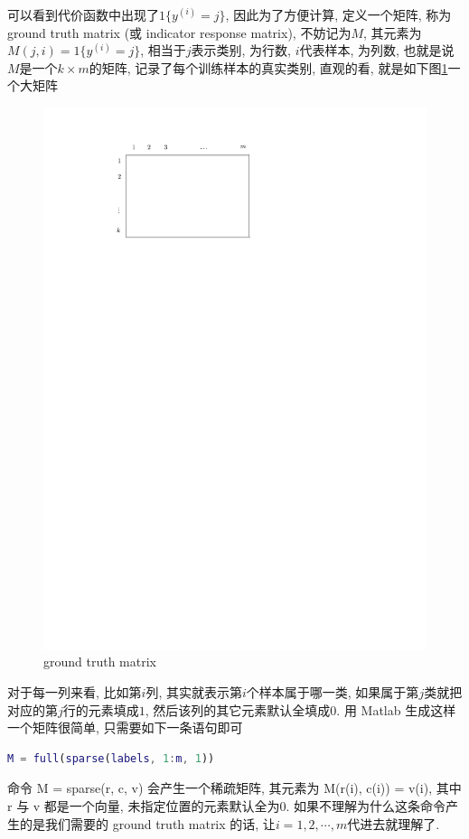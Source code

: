\documentclass[a4paper,UTF8]{ctexart}
\theoremstyle{plain} \newtheorem{theorem}{定理}[section]
\theoremstyle{plain} \newtheorem{definition}{定义}[section]
\theoremstyle{plain} \newtheorem{lemma}{引理}[section]
\theoremstyle{plain} \newtheorem{proposition}{命题}[section]
\theoremstyle{plain} \newtheorem{example}{例}[section]
\theoremstyle{plain} \newtheorem{remark}{注}[section]
\theoremstyle{plain} \newtheorem{corollary}{推论}[section]
\begin{document}
可以看到代价函数中出现了$1\{y^{(i)} = j\}$, 因此为了方便计算, 定义一个矩阵, 称为 ground truth matrix (或 indicator response matrix), 不妨记为$M$, 其元素为$M(j, i) = 1\{y^{(i)} = j\}$, 相当于$j$表示类别, 为行数, $i$代表样本, 为列数, 也就是说$M$是一个$k \times m$的矩阵, 记录了每个训练样本的真实类别, 直观的看, 就是如下图\ref{ground}一个大矩阵
\begin{figure}[!htb]
	\centering
	\includegraphics[width = 0.75 \textwidth]{ground.pdf}
	\caption{ground truth matrix}
	\label{ground}
\end{figure}

对于每一列来看, 比如第$i$列, 其实就表示第$i$个样本属于哪一类, 如果属于第$j$类就把对应的第$j$行的元素填成$1$, 然后该列的其它元素默认全填成$0$. 用 Matlab 生成这样一个矩阵很简单, 只需要如下一条语句即可
\begin{lstlisting}[language=matlab]
M = full(sparse(labels, 1:m, 1))
\end{lstlisting}

命令 M = sparse(r, c, v) 会产生一个稀疏矩阵, 其元素为 M(r(i), c(i)) = v(i), 其中 r 与 v 都是一个向量, 未指定位置的元素默认全为$0$. 如果不理解为什么这条命令产生的是我们需要的 ground truth matrix 的话, 让$i=1,2,\cdots, m$代进去就理解了.
\end{document}
